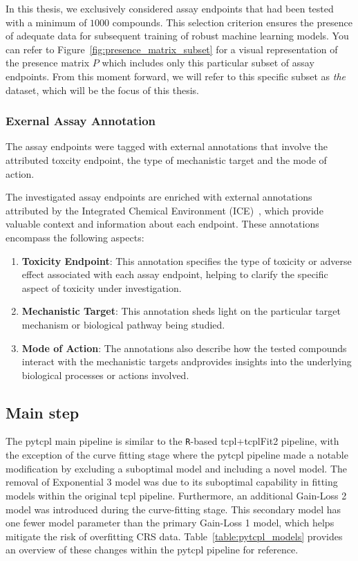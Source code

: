 In this thesis, we exclusively considered assay endpoints that had been tested with a minimum of $\num{1000}$ compounds. This selection criterion ensures the presence of adequate data for subsequent training of robust machine learning models. You can refer to Figure~\ref{fig:presence_matrix_subset} for a visual representation of the presence matrix $P$ which includes only this particular subset of assay endpoints. From this moment forward, we will refer to this specific subset as \emph{the} dataset, which will be the focus of this thesis. 

\subsubsection{Exernal Assay Annotation}
The assay endpoints were tagged with external annotations that involve the attributed toxcity endpoint, the type of mechanistic target and the mode of action.

The investigated assay endpoints are enriched with external annotations attributed by the Integrated Chemical Environment (ICE)~\cite{ice2022}, which provide valuable context and information about each endpoint. These annotations encompass the following aspects:

\begin{enumerate}
    \item \textbf{Toxicity Endpoint}: This annotation specifies the type of toxicity or adverse effect associated with each assay endpoint, helping to clarify the specific aspect of toxicity under investigation.
    
    \item \textbf{Mechanistic Target}: This annotation sheds light on the particular target mechanism or biological pathway being studied.
    
    \item \textbf{Mode of Action}: The annotations also describe how the tested compounds interact with the mechanistic targets andprovides insights into the underlying biological processes or actions involved.
\end{enumerate}

\subsection{Main step}
The pytcpl main pipeline is similar to the \texttt{R}-based tcpl+tcplFit2 pipeline, with the exception of the curve fitting stage where the pytcpl pipeline made a notable modification by excluding a suboptimal model and including a novel model. The removal of Exponential 3 model was due to its suboptimal capability in fitting models within the original tcpl pipeline. Furthermore, an additional Gain-Loss 2 model was introduced during the curve-fitting stage. This secondary model has one fewer model parameter than the primary Gain-Loss 1 model, which helps mitigate the risk of overfitting CRS data. Table~\ref{table:pytcpl_models} provides an overview of these changes within the pytcpl pipeline for reference.


